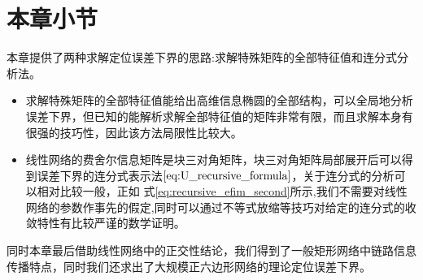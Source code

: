 \section{本章小节}\label{section:conclusion4}
   本章提供了两种求解定位误差下界的思路:求解特殊矩阵的全部特征值和连分式分析法。

  \begin{itemize}
  \item 求解特殊矩阵的全部特征值能给出高维信息椭圆的全部结构，可以全局地分析误差下界，但已知的能解析求解全部特征值的矩阵非常有限，而且求解本身有很强的技巧性，因此该方法局限性比较大。
  \item 线性网络的费舍尔信息矩阵是块三对角矩阵，块三对角矩阵局部展开后可以得到误差下界的连分式表示法$\ref{eq:U_recursive_formula}$，关于连分式的分析可以相对比较一般，正如 式\ref{eq:recursive_efim_second}所示,我们不需要对线性网络的参数作事先的假定,同时可以通过不等式放缩等技巧对给定的连分式的收敛特性有比较严谨的数学证明。
  \end{itemize}

  同时本章最后借助线性网络中的正交性结论，我们得到了一般矩形网络中链路信息传播特点，同时我们还求出了大规模正六边形网络的理论定位误差下界。